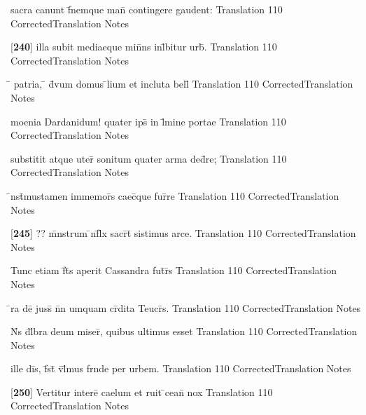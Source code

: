\latline
  {sacra canunt f\={}nemque man\={} contingere gaudent:}
  { Translation }
  {110}
  { CorrectedTranslation }
  { Notes }


\latline
  {[\textbf{240}] illa subit mediaeque min\={}ns inl\={}bitur urb\={\macron {\i}}.}
  { Translation }
  {110}
  { CorrectedTranslation }
  { Notes }


\latline
  {\={} patria, \={} d\={\macron {\i}}vum domus \={}lium et incluta bell\={}}
  { Translation }
  {110}
  { CorrectedTranslation }
  { Notes }


\latline
  {moenia Dardanidum! quater ips\={} in l\={\macron {\i}}mine portae}
  { Translation }
  {110}
  { CorrectedTranslation }
  { Notes }


\latline
  {substitit atque uter\={} sonitum quater arma ded\={}re;}
  { Translation }
  {110}
  { CorrectedTranslation }
  { Notes }


\latline
  {\={\macron {\i}}nst\={}mustamen immemor\={}s caec\={\macron {\i}}que fur\={}re}
  { Translation }
  {110}
  { CorrectedTranslation }
  { Notes }


\latline
  {[\textbf{245}] ?? m\={}nstrum \={\macron {\i}}nf\={}l\={\macron {\i}}x sacr\={}t\={} sistimus arce.}
  { Translation }
  {110}
  { CorrectedTranslation }
  { Notes }


\latline
  {Tunc etiam f\={}t\={\macron {\i}}s aperit Cassandra fut\={}r\={\macron {\i}}s}
  { Translation }
  {110}
  { CorrectedTranslation }
  { Notes }


\latline
  {\={}ra de\={\macron {\i}}  juss\={} n\={}n umquam cr\={}dita Teucr\={\macron {\i}}s.}
  { Translation }
  {110}
  { CorrectedTranslation }
  { Notes }


\latline
  {N\={}s d\={}l\={}bra deum miser\={\macron {\i}}, quibus ultimus esset}
  { Translation }
  {110}
  { CorrectedTranslation }
  { Notes }


\latline
  {ille di\={}s, f\={}st\={} v\={}l\={}mus frnde per urbem.}
  { Translation }
  {110}
  { CorrectedTranslation }
  { Notes }


\latline
  {[\textbf{250}] Vertitur intere\={} caelum et ruit \={}cean\={} nox}
  { Translation }
  {110}
  { CorrectedTranslation }
  { Notes }


